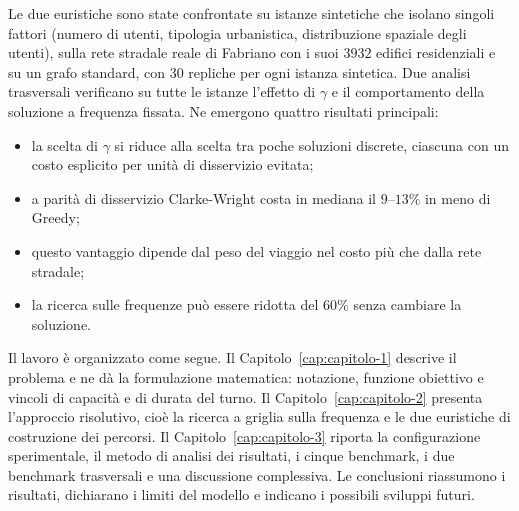 \medskip\noindent
Le due euristiche sono state confrontate su istanze sintetiche che isolano singoli fattori (numero di utenti, tipologia urbanistica, distribuzione spaziale degli utenti), sulla rete stradale reale di Fabriano con i suoi $3932$ edifici residenziali e su un grafo standard, con 30 repliche per ogni istanza sintetica. Due analisi trasversali verificano su tutte le istanze l'effetto di $\gamma$ e il comportamento della soluzione a frequenza fissata. Ne emergono quattro risultati principali:
\begin{itemize}
	\item la scelta di $\gamma$ si riduce alla scelta tra poche soluzioni discrete, ciascuna con un costo esplicito per unità di disservizio evitata;
	\item a parità di disservizio Clarke-Wright costa in mediana il $9$--$13\%$ in meno di Greedy;
	\item questo vantaggio dipende dal peso del viaggio nel costo più che dalla rete stradale;
	\item la ricerca sulle frequenze può essere ridotta del $60\%$ senza cambiare la soluzione.
\end{itemize}

\medskip\noindent
Il lavoro è organizzato come segue. Il Capitolo~\ref{cap:capitolo-1} descrive il problema e ne dà la formulazione matematica: notazione, funzione obiettivo e vincoli di capacità e di durata del turno. Il Capitolo~\ref{cap:capitolo-2} presenta l'approccio risolutivo, cioè la ricerca a griglia sulla frequenza e le due euristiche di costruzione dei percorsi. Il Capitolo~\ref{cap:capitolo-3} riporta la configurazione sperimentale, il metodo di analisi dei risultati, i cinque benchmark, i due benchmark trasversali e una discussione complessiva. Le conclusioni riassumono i risultati, dichiarano i limiti del modello e indicano i possibili sviluppi futuri.